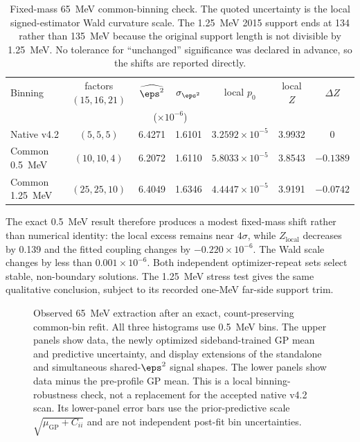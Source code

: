\begin{table}[H]
\centering
\small
\caption{Fixed-mass 65~MeV common-binning check.  The quoted uncertainty is the
local signed-estimator Wald curvature scale.  The 1.25~MeV 2015 support ends at
134 rather than 135~MeV because the original support length is not divisible
by 1.25~MeV.  No tolerance for ``unchanged'' significance was declared in
advance, so the shifts are reported directly.}
\label{tab:v4p2-common-binning-m065}
\begin{tabular}{lcccccc}
\toprule
Binning & factors $(15,16,21)$ &
$\widehat{\eps^2}$ & $\sigma_{\eps^2}$ & local $p_0$ & local $Z$ &
$\Delta Z$ \\
 & & \multicolumn{2}{c}{($\times10^{-6}$)} & & & \\
\midrule
Native v4.2 & $(5,5,5)$ & 6.4271 & 1.6101 &
$3.2592\times10^{-5}$ & 3.9932 & 0 \\
Common 0.5~MeV & $(10,10,4)$ & 6.2072 & 1.6110 &
$5.8033\times10^{-5}$ & 3.8543 & $-0.1389$ \\
Common 1.25~MeV & $(25,25,10)$ & 6.4049 & 1.6346 &
$4.4447\times10^{-5}$ & 3.9191 & $-0.0742$ \\
\bottomrule
\end{tabular}
\end{table}

The exact 0.5~MeV result therefore produces a modest fixed-mass shift rather
than numerical identity: the local excess remains near $4\sigma$, while
$Z_{\mathrm{local}}$ decreases by 0.139 and the fitted coupling changes by
$-0.220\times10^{-6}$.  The Wald scale changes by less than
$0.001\times10^{-6}$.  Both independent optimizer-repeat sets select stable,
non-boundary solutions.  The 1.25~MeV stress test gives the same qualitative
conclusion, subject to its recorded one-MeV far-side support trim.

\begin{figure}[H]
\centering
{}
\caption{Observed 65~MeV extraction after an exact, count-preserving common-bin
refit.  All three histograms use 0.5~MeV bins.  The upper panels show data, the
newly optimized sideband-trained GP mean and predictive uncertainty, and
display extensions of the standalone and simultaneous shared-$\eps^2$ signal
shapes.  The lower panels show data minus the pre-profile GP mean.  This is a
local binning-robustness check, not a replacement for the accepted native v4.2
scan.  Its lower-panel error bars use the prior-predictive scale
$\sqrt{\mu_{\mathrm{GP}}+C_{ii}}$ and are not independent post-fit bin
uncertainties.}
\label{fig:appendix-v4p2-common-binning-m065}
\end{figure}

